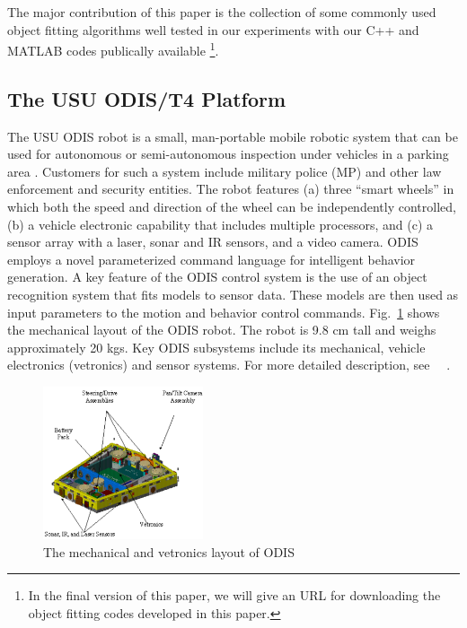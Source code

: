 \documentclass{cdcarta4}
\begin{document}
The major contribution of this paper is the collection of some commonly used object fitting algorithms well tested in our experiments with our C++ and MATLAB codes publically available 
\footnote{In the final version of this paper, we will give an URL for downloading the object fitting codes developed in this paper.}.


\subsection{The USU ODIS/T4 Platform}

The USU ODIS  robot is   a small, man-portable mobile robotic system that can be used for autonomous or 
 semi-autonomous inspection under vehicles in a parking area \cite{moore_csm}. Customers for such a system include military police (MP) and other law enforcement and security entities. The robot features (a) three ``smart wheels''  in which both the speed and direction of the wheel can be independently controlled, (b) a vehicle electronic capability that includes multiple processors, and (c) a sensor array with a laser, sonar and IR sensors, and a video camera. ODIS employs a novel parameterized command language for intelligent behavior generation. A key feature of the ODIS control system is the use of an object recognition system that fits models to sensor data. These models are then used as input parameters to the motion and behavior control commands.
Fig.~\ref{fig:odis1} shows the mechanical layout of the ODIS robot. The robot is 9.8 cm tall and weighs approximately 20 kgs. Key ODIS subsystems include its mechanical, vehicle electronics (vetronics) and sensor systems.  For more detailed description, see ~\cite{odis_spie01}~\cite{odis_icra01}.
%
%
\begin{figure}[!htb]
    \center
    \includegraphics[width=7.cm,height=4.5cm]{img/odis1}
    \caption{The mechanical and vetronics layout of ODIS}  \label{fig:odis1}
\end{figure} 
\end{document}
